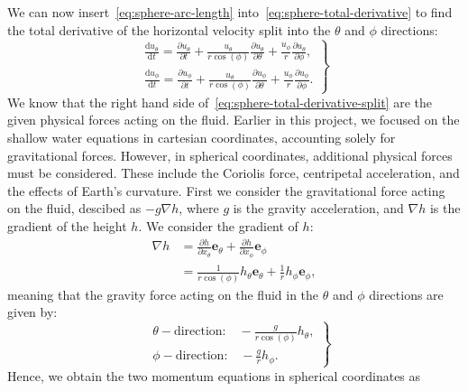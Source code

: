 We can now insert~\eqref{eq:sphere-arc-length} into~\eqref{eq:sphere-total-derivative} to find the total derivative of the horizontal velocity split into the $\theta$ and $\phi$ directions:
\begin{equation}\label{eq:sphere-total-derivative-split}
    \left.
    \begin{aligned}
        \frac{\text{d}u_\theta}{\text{d}t} = \frac{\partial u_\theta}{\partial t} + \frac{u_\theta}{r \cos(\phi)} \frac{\partial u_\theta}{\partial \theta} + \frac{u_\phi}{r} \frac{\partial u_\theta}{\partial \phi}, \\
        \frac{\text{d}u_\phi}{\text{d}t} = \frac{\partial u_\phi}{\partial t} + \frac{u_\theta}{r \cos(\phi)} \frac{\partial u_\phi}{\partial \theta} + \frac{u_\phi}{r} \frac{\partial u_\phi}{\partial \phi}.
    \end{aligned}
    \right\}
\end{equation}
We know that the right hand side of~\eqref{eq:sphere-total-derivative-split} are the given physical forces acting on the fluid.
Earlier in this project, we focused on the shallow water equations in cartesian coordinates, accounting solely for gravitational forces.
However, in spherical coordinates, additional physical forces must be considered. These include the Coriolis force, centripetal acceleration, and the effects of Earth's curvature.
First we consider the gravitational force acting on the fluid, descibed as $-g \nabla h$, where $g$ is the gravity acceleration, and $\nabla h$ is the gradient of the height $h$.
We consider the gradient of $h$:
\begin{align}
    \nabla h &= \frac{\partial h}{\partial x_\theta} \mathbf{e}_{\theta} + \frac{\partial h}{\partial x_\phi} \mathbf{e}_{\phi} \\
     &= \frac{1}{r \cos(\phi)} h_{\theta} \mathbf{e}_{\theta} + \frac{1}{r } h_{\phi} \mathbf{e}_{\phi},
\end{align}
meaning that the gravity force acting on the fluid in the $\theta$ and $\phi$ directions are given by:
\begin{equation*}
    \left.
    \begin{aligned}
        &\theta-\text{direction:} \quad -\frac{g}{r \cos(\phi)} h_{\theta},\\
        &\phi-\text{direction:} \quad -\frac{g}{r} h_{\phi}.
    \end{aligned}
    \right\}
\end{equation*}
Hence, we obtain the two momentum equations in spherical coordinates as

